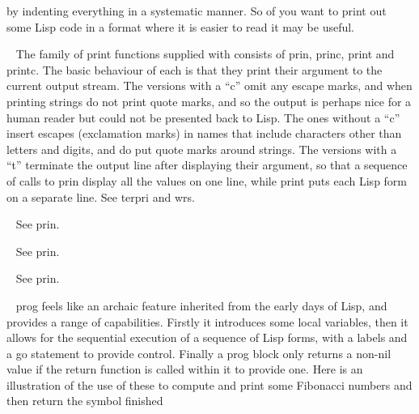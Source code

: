 \begin{description}
by indenting everything in a systematic manner. So of you want to print out
some Lisp code in a format where it is easier to read it may be useful.
\item[{\tx prin~~~~~~~~~} \hspace{1cm} {\em function 1 arg}]~\newline
The family of print functions supplied with \vsl{} consists of
{\tx prin}, {\tx princ}, {\tx print} and {\tx printc}. The basic behaviour
of each is that they print their argument to the current output stream. The versions
with a ``{\tx c}'' omit any escape marks, and when printing strings do not
print quote marks, and so the output is perhaps nice for a human reader
but could not be presented back to Lisp. The ones without a ``{\tx c}''
insert escapes (exclamation marks) in names that include characters other
than letters and digits, and do put quote marks around strings. The versions
with a ``{\tx t}'' terminate the output line after displaying their
argument, so that a sequence of calls to {\tx prin} display all the
values on one line, while {\tx print} puts each Lisp form on a separate line.
See {\tx terpri} and {\tx wrs}.
\item[{\tx princ~~~~~~~~} \hspace{1cm} {\em function 1 arg}]~\newline
See {\tx prin}.
\item[{\tx print~~~~~~~~} \hspace{1cm} {\em function 1 arg}]~\newline
See {\tx prin}.
\item[{\tx printc~~~~~~~} \hspace{1cm} {\em function 1 arg}]~\newline
See {\tx prin}.
\item[{\tx prog~~~~~~~~~} \hspace{1cm} {\em special form}]~\newline
{\tx prog} feels like an archaic feature inherited from the early days of Lisp,
and provides a range of capabilities. Firstly it introduces some local
variables, then it allows for the sequential execution of a sequence of
Lisp forms, with a labels and a {\tx go} statement to provide control. Finally
a {\tx prog} block only returns a non-nil value if the {\tx return} function
is called within it to provide one. Here is an illustration of the
use of these to compute and print some Fibonacci numbers and then return the
symbol {\tx finished}
{\small\begin{verbatim}

\end{verbatim}}
\end{description}
